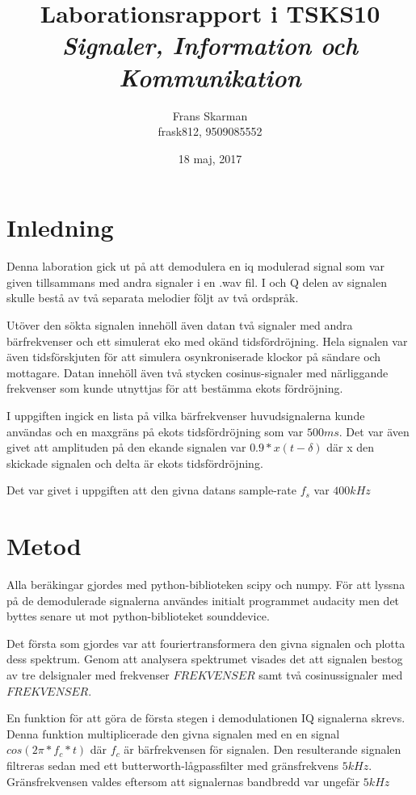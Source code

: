 \documentclass[10pt,twocolumn]{article}
\title{Laborationsrapport i TSKS10 \emph{Signaler, Information och Kommunikation}}
\author{Frans Skarman \\ frask812, 9509085552 }
\date{18 maj, 2017}
\begin{document}
\maketitle

\section{Inledning}

Denna laboration gick ut på att demodulera en iq modulerad signal som var given
tillsammans med andra signaler i en .wav fil. I och Q delen av signalen skulle
bestå av två separata melodier följt av två ordspråk.

Utöver den sökta signalen innehöll även datan två signaler med andra bärfrekvenser
och ett simulerat eko med okänd tidsfördröjning. Hela signalen var även tidsförskjuten
för att simulera osynkroniserade klockor på sändare och mottagare. Datan innehöll
även två stycken cosinus-signaler med närliggande frekvenser som kunde utnyttjas för
att bestämma ekots fördröjning.

I uppgiften ingick en lista på vilka bärfrekvenser huvudsignalerna kunde användas och
en maxgräns på ekots tidsfördröjning som var $500ms$. Det var även givet att amplituden
på den ekande signalen var $0.9*x(t-\delta)$ där x den skickade signalen och delta
är ekots tidsfördröjning.

Det var givet i uppgiften att den givna datans sample-rate $f_s$ var $400kHz$



\section{Metod}


Alla beräkingar gjordes med python-biblioteken scipy och numpy. För att lyssna på de demodulerade
signalerna användes initialt programmet audacity men det byttes senare ut mot python-biblioteket
sounddevice.

Det första som gjordes var att fouriertransformera den givna signalen och plotta
dess spektrum. Genom att analysera spektrumet visades det att signalen bestog av tre
delsignaler med frekvenser $FREKVENSER$ samt två cosinussignaler med $FREKVENSER$.

En funktion för att göra de första stegen i demodulationen IQ signalerna skrevs. Denna
funktion multiplicerade den givna signalen med en en signal $cos(2\pi*f_c*t)$ där $f_c$
är bärfrekvensen för signalen. Den resulterande signalen filtreras sedan med ett 
butterworth-lågpassfilter med gränsfrekvens $5 kHz$. Gränsfrekvensen valdes eftersom
att signalernas bandbredd var ungefär $5 kHz$
\end{document}
